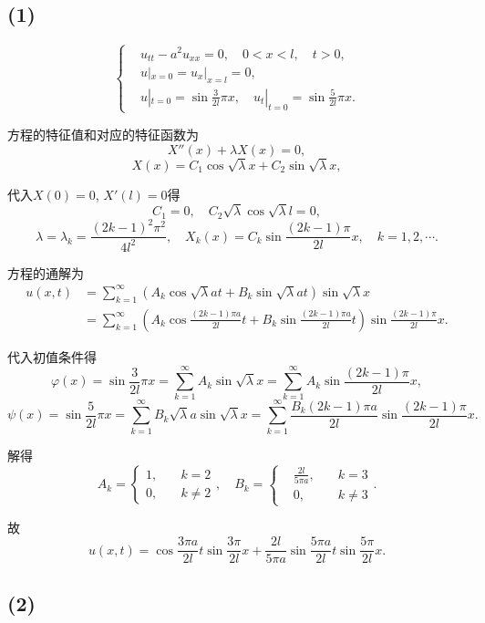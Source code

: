 \documentclass[11pt,a4paper]{article}
\begin{document}
\subsection*{(1)}

$$
  \left\{\begin{aligned}
     & u_{tt}-a^2u_{xx}=0, \quad 0<x<l,\quad t>0,                             \\
     & u|_{x=0}=u_x|_{x=l}=0,                                                 \\
     & u|_{t=0}=\sin\frac{3}{2l}\pi x,\quad u_t|_{t=0}=\sin\frac{5}{2l}\pi x.
  \end{aligned}\right.
$$

方程的特征值和对应的特征函数为
$$X''(x)+\lambda X(x)=0,$$
$$X(x)=C_1\cos\sqrt{\lambda}x+C_2\sin\sqrt{\lambda}x,$$

代入$X(0)=0$, $X'(l)=0$得
$$C_1=0,\quad C_2\sqrt{\lambda}\cos\sqrt{\lambda}l=0,$$
$$\lambda=\lambda_k=\frac{(2k-1)^2\pi^2}{4l^2},\quad X_k(x)=C_k\sin\frac{(2k-1)\pi}{2l}x,\quad k=1,2,\cdots.$$

方程的通解为
\begin{align*}
  u(x,t)
   & =\sum_{k=1}^\infty\left(A_k\cos\sqrt{\lambda}at+
  B_k\sin\sqrt{\lambda}at\right)\sin\sqrt{\lambda}x          \\
   & =\sum_{k=1}^\infty\left(A_k\cos\frac{(2k-1)\pi a}{2l}t+
  B_k\sin\frac{(2k-1)\pi a}{2l}t\right)\sin\frac{(2k-1)\pi}{2l}x.
\end{align*}

代入初值条件得
$$\varphi(x)=\sin\frac{3}{2l}\pi x=\sum_{k=1}^\infty A_k\sin\sqrt{\lambda}x=\sum_{k=1}^\infty A_k\sin\frac{(2k-1)\pi }{2l}x,$$
$$\psi(x)=\sin\frac{5}{2l}\pi x=\sum_{k=1}^\infty B_k\sqrt{\lambda}a\sin\sqrt{\lambda}x=\sum_{k=1}^\infty \frac{B_k(2k-1)\pi a}{2l}\sin\frac{(2k-1)\pi}{2l}x.$$

解得
$$A_k=\left\{\begin{aligned}1, &\quad k = 2 \\ 0, &\quad k\neq 2 \end{aligned}\right.,\quad B_k=\left\{\begin{aligned}&\frac{2l}{5\pi a}, &\quad k = 3 \\ &0, &\quad k\neq 3 \end{aligned}\right..$$

故
$$u(x,t)=\cos\frac{3\pi a}{2l}t\sin\frac{3\pi}{2l}x+
  \frac{2l}{5\pi a}\sin\frac{5\pi a}{2l}t\sin\frac{5\pi}{2l}x.$$

\subsection*{(2)}
\end{document}
